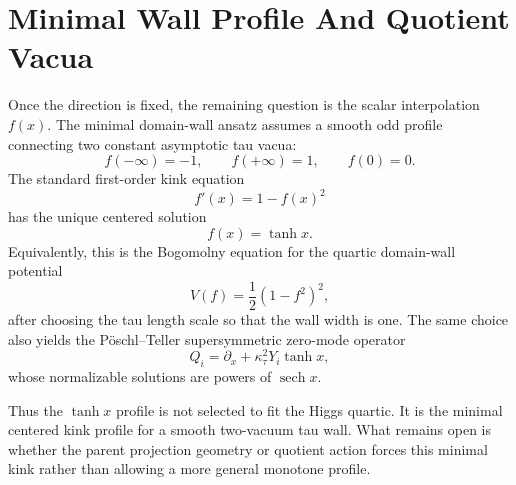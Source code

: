 \documentclass[11pt]{article}
\begin{document}
\section{Minimal Wall Profile And Quotient Vacua}
Once the direction is fixed, the remaining question is the scalar interpolation
$f(x)$. The minimal domain-wall ansatz assumes a smooth odd profile connecting
two constant asymptotic tau vacua:
\begin{equation}
f(-\infty)=-1,\qquad f(+\infty)=1,\qquad f(0)=0 .
\end{equation}
The standard first-order kink equation
\begin{equation}
f'(x)=1-f(x)^2
\end{equation}
has the unique centered solution
\begin{equation}
f(x)=\tanh x .
\end{equation}
Equivalently, this is the Bogomolny equation for the quartic domain-wall
potential
\begin{equation}
V(f)=\frac12(1-f^2)^2 ,
\end{equation}
after choosing the tau length scale so that the wall width is one. The same
choice also yields the Pöschl--Teller supersymmetric zero-mode operator
\begin{equation}
Q_i=\partial_x+\kappa_\tau^2Y_i\tanh x ,
\end{equation}
whose normalizable solutions are powers of $\operatorname{sech}x$.

Thus the $\tanh x$ profile is not selected to fit the Higgs quartic. It is the
minimal centered kink profile for a smooth two-vacuum tau wall. What remains
open is whether the parent projection geometry or quotient action forces this
minimal kink rather than allowing a more general monotone profile.
\end{document}
